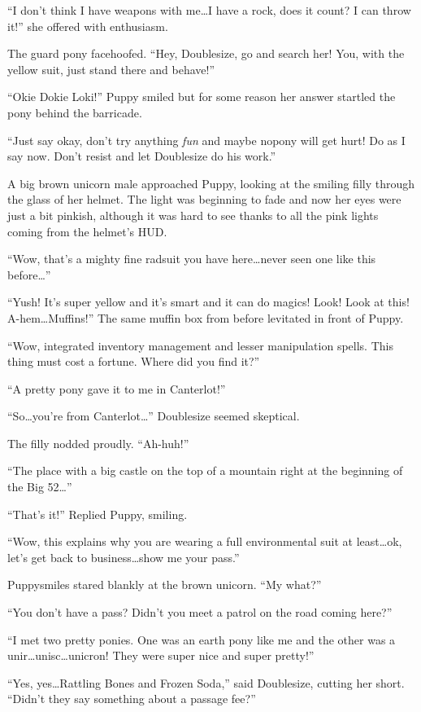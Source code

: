 ``I don't think I have weapons with me\dots I have a rock, does it count? I can throw it!'' she offered with enthusiasm.

The guard pony facehoofed. ``Hey, Doublesize, go and search her! You, with the yellow suit, just stand there and behave!''

``Okie Dokie Loki!'' Puppy smiled but for some reason her answer startled the pony behind the barricade.

``Just say okay, don't try anything \emph{fun} and maybe nopony will get hurt! Do as I say now. Don't resist and let Doublesize do his work.''

A big brown unicorn male approached Puppy, looking at the smiling filly through the glass of her helmet. The light was beginning to fade and now her eyes were just a bit pinkish, although it was hard to see thanks to all the pink lights coming from the helmet's HUD.

``Wow, that's a mighty fine radsuit you have here\dots never seen one like this before\dots''

``Yush! It's super yellow and it's smart and it can do magics! Look! Look at this! A-hem\dots Muffins!'' The same muffin box from before levitated in front of Puppy.

``Wow, integrated inventory management and lesser manipulation spells. This thing must cost a fortune. Where did you find it?''

``A pretty pony gave it to me in Canterlot!''

``So\dots you're from Canterlot\dots'' Doublesize seemed skeptical.

The filly nodded proudly. ``Ah-huh!''

``The place with a big castle on the top of a mountain right at the beginning of the Big 52\dots''

``That's it!'' Replied Puppy, smiling.

``Wow, this explains why you are wearing a full environmental suit at least\dots ok, let's get back to business\dots show me your pass.''

Puppysmiles stared blankly at the brown unicorn. ``My what?''

``You don't have a pass? Didn't you meet a patrol on the road coming here?''

``I met two pretty ponies. One was an earth pony like me and the other was a unir\dots unisc\dots unicron! They were super nice and super pretty!''

``Yes, yes\dots Rattling Bones and Frozen Soda,'' said Doublesize, cutting her short. ``Didn't they say something about a passage fee?''

